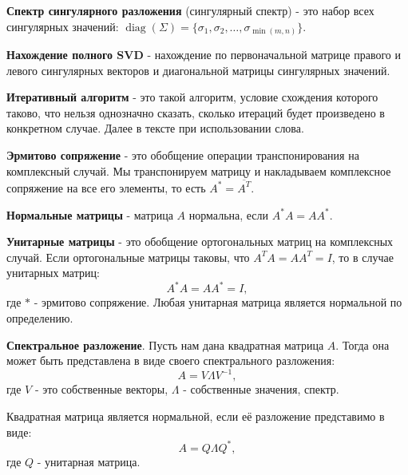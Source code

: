 \hspace{0.45cm} \textbf{Спектр сингулярного разложения} (сингулярный спектр) - это набор всех сингулярных значений: \( \operatorname{diag}(\Sigma) = \{ \sigma_1, \sigma_2, \dots, \sigma_{\min(m, n)} \} \).

\textbf{Нахождение полного SVD} - нахождение по первоначальной матрице правого и левого сингулярных векторов и диагональной матрицы сингулярных значений. 

\textbf{Итеративный алгоритм} - это такой алгоритм, условие схождения которого таково, что нельзя однозначно сказать, сколько итераций будет произведено в конкретном случае. Далее в тексте при использовании слова. 

\textbf{Эрмитово сопряжение} - это обобщение операции транспонирования на комплексный случай. Мы транспонируем матрицу и накладываем комплексное сопряжение на все его элементы, то есть \(A^*=\overline{A^T}\).

\textbf{Нормальные матрицы} - матрица \(A\) нормальна, если \(A^*A=AA^*\).

\textbf{Унитарные матрицы} - это обобщение ортогональных матриц на комплексных случай. Если ортогональные матрицы таковы, что \(A^TA=AA^T=I\), то в случае унитарных матриц:
\[A^*A=AA^*=I,\]
где \(*\) - эрмитово сопряжение. Любая унитарная матрица является нормальной по определению.

\textbf{Спектральное разложение}. Пусть нам дана квадратная матрица \(A\). Тогда она может быть представлена в виде своего спектрального разложения:
\[ A=V\Lambda V^{-1},\]
 где \(V\) - это собственные векторы, \(\Lambda\) - собственные значения, спектр.

Квадратная матрица является нормальной, если её разложение представимо в виде:
\[A=Q \Lambda Q^*,\]
где \(Q\) - унитарная матрица. 

